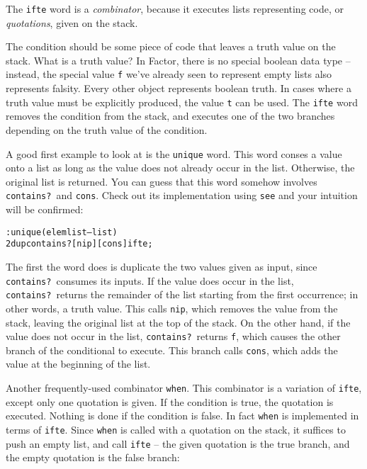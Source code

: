 \documentclass[english]{book}
\begin{document}
The \texttt{ifte} word is a \emph{combinator}, because it executes lists representing code, or \emph{quotations}, given on the stack.

The condition should be some piece of code that leaves a truth value on the stack. What is a truth value? In Factor, there is no special boolean data type
-- instead, the special value \texttt{f} we've already seen to represent empty lists also represents falsity. Every other object represents boolean truth. In cases where a truth value must be explicitly produced, the value \texttt{t} can be used. The \texttt{ifte} word removes the condition from the stack, and executes one of the two branches depending on the truth value of the condition.

A good first example to look at is the \texttt{unique} word. This word conses a value onto a list as long as the value does not already occur in the list. Otherwise, the original list is returned. You can guess that this word somehow involves \texttt{contains?}~and \texttt{cons}. Check out its implementation using \texttt{see} and your intuition will be confirmed:

\begin{alltt}
: unique ( elem list -- list )
    2dup contains? [ nip ] [ cons ] ifte ;
\end{alltt}

The first the word does is duplicate the two values given as input, since \texttt{contains?}~consumes its inputs. If the value does occur in the list, \texttt{contains?}~returns the remainder of the list starting from the first occurrence; in other words, a truth value. This calls \texttt{nip}, which removes the value from the stack, leaving the original list at the top of the stack. On the other hand, if the value does not occur in the list, \texttt{contains?}~returns \texttt{f}, which causes the other branch of the conditional to execute. This branch calls \texttt{cons}, which adds the value at the beginning of the list. 

Another frequently-used combinator \texttt{when}. This combinator is a variation of \texttt{ifte}, except only one quotation is given. If the condition is true, the quotation is executed. Nothing is done if the condition is false. In fact \texttt{when} is implemented in terms of \texttt{ifte}. Since \texttt{when} is called with a quotation on the stack, it suffices to push an empty list, and call \texttt{ifte} -- the given quotation is the true branch, and the empty quotation is the false branch:
\end{document}
